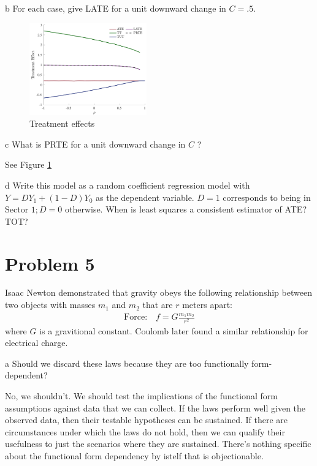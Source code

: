 \documentclass{article}
\begin{document}
\begin{problem}{b}
For each case, give LATE for a unit downward change in $C=.5$.
\end{problem}
\begin{solution}
\begin{figure}[htb]
    \centering
    \includegraphics[width=0.45\textwidth]{ps1Heckman/Figures/treatments.pdf}
    \caption{Treatment effects}
    \label{ps1H:q4:fig2}
\end{figure}\end{solution}
\begin{problem}{c}
What is PRTE for a unit downward change in $C$ ?
\end{problem}
\begin{solution}
See Figure \ref{ps1H:q4:fig2}
\end{solution}
\begin{problem}{d}
Write this model as a random coefficient regression model with $Y=D Y_{1}+(1-D) Y_{0}$ as the dependent variable. $D=1$ corresponds to being in Sector $1 ; D=0$ otherwise. When is least squares a consistent estimator of ATE? TOT?
\end{problem}
\begin{solution}

\end{solution}


\newpage
\section*{Problem 5}
Isaac Newton demonstrated that gravity obeys the following relationship between two objects with masses $m_{1}$ and $m_{2}$ that are $r$ meters apart:
\begin{align*}
\text{Force:} \quad f=G \frac{m_{1} m_{2}}{r^{2}}
\end{align*}
where $G$ is a gravitional constant. Coulomb later found a similar relationship for electrical charge.
\begin{problem}{a}
Should we discard these laws because they are too functionally form-dependent?
\end{problem}
No, we shouldn't. We should test the implications of the functional form assumptions against data that we can collect. If the laws perform well given the observed data, then their testable hypotheses can be sustained. If there are circumstances under which the laws do not hold, then we can qualify their usefulness to just the scenarios where they are sustained. There's nothing specific about the functional form dependency by istelf that is objectionable.
\end{document}
